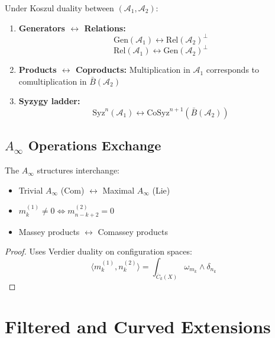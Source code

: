 \begin{theorem}
Under Koszul duality between $(\mathcal{A}_1, \mathcal{A}_2)$:
\begin{enumerate}
\item \textbf{Generators $\leftrightarrow$ Relations:}
$$\text{Gen}(\mathcal{A}_1) \leftrightarrow \text{Rel}(\mathcal{A}_2)^{\perp}$$
$$\text{Rel}(\mathcal{A}_1) \leftrightarrow \text{Gen}(\mathcal{A}_2)^{\perp}$$

\item \textbf{Products $\leftrightarrow$ Coproducts:}
Multiplication in $\mathcal{A}_1$ corresponds to comultiplication in $\bar{B}(\mathcal{A}_2)$

\item \textbf{Syzygy ladder:}
$$\text{Syz}^n(\mathcal{A}_1) \leftrightarrow \text{CoSyz}^{n+1}(\bar{B}(\mathcal{A}_2))$$
\end{enumerate}
\end{theorem}

\subsection{$A_\infty$ Operations Exchange}

\begin{theorem}
The $A_\infty$ structures interchange:
\begin{itemize}
\item Trivial $A_\infty$ (Com) $\leftrightarrow$ Maximal $A_\infty$ (Lie)
\item $m_k^{(1)} \neq 0 \Leftrightarrow m_{n-k+2}^{(2)} = 0$
\item Massey products $\leftrightarrow$ Comassey products
\end{itemize}
\end{theorem}

\begin{proof}
Uses Verdier duality on configuration spaces:
$$\langle m_k^{(1)}, n_k^{(2)} \rangle = \int_{\overline{C}_k(X)} \omega_{m_k} \wedge \delta_{n_k}$$
\end{proof}


\section{Filtered and Curved Extensions}

